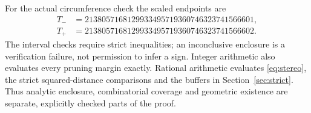 \documentclass[11pt]{article}
\theoremstyle{definition}
\theoremstyle{remark}
\begin{document}
For the actual circumference check the scaled endpoints are
\begin{align*}
T_-&=2138057168129933495719360746323741566601,\\
T_+&=2138057168129933495719360746323741566602.
\end{align*}
The interval checks require strict inequalities; an inconclusive enclosure
is a verification failure, not permission to infer a sign. Integer arithmetic
also evaluates every pruning margin exactly. Rational arithmetic evaluates
\eqref{eq:stereo}, the strict squared-distance comparisons and the buffers
in Section~\ref{sec:strict}. Thus analytic enclosure, combinatorial coverage
and geometric existence are separate, explicitly checked parts of the proof.


\end{document}

